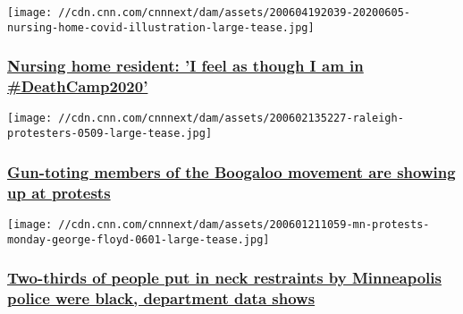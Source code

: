 \href{/2020/06/05/us/nursing-home-resident-coronavirus-invs/index.html}{}

\texttt{[image: //cdn.cnn.com/cnnnext/dam/assets/200604192039-20200605-nursing-home-covid-illustration-large-tease.jpg]}

\hypertarget{nursing-home-resident-i-feel-as-though-i-am-in-deathcamp2020}{%
\subsubsection{\texorpdfstring{\href{/2020/06/05/us/nursing-home-resident-coronavirus-invs/index.html}{Nursing
home resident: 'I feel as though I am in
\#DeathCamp2020'}}{Nursing home resident: 'I feel as though I am in \#DeathCamp2020'}}\label{nursing-home-resident-i-feel-as-though-i-am-in-deathcamp2020}}

\href{/2020/06/03/us/boogaloo-extremist-protests-invs/index.html}{}

\texttt{[image: //cdn.cnn.com/cnnnext/dam/assets/200602135227-raleigh-protesters-0509-large-tease.jpg]}

\hypertarget{gun-toting-members-of-the-boogaloo-movement-are-showing-up-at-protests-}{%
\subsubsection{\texorpdfstring{\href{/2020/06/03/us/boogaloo-extremist-protests-invs/index.html}{Gun-toting
members of the Boogaloo movement are showing up at protests
}}{Gun-toting members of the Boogaloo movement are showing up at protests }}\label{gun-toting-members-of-the-boogaloo-movement-are-showing-up-at-protests-}}

\href{/2020/06/02/us/mn-minneapolis-police-neck-restraints-george-floyd-invs/index.html}{}

\texttt{[image: //cdn.cnn.com/cnnnext/dam/assets/200601211059-mn-protests-monday-george-floyd-0601-large-tease.jpg]}

\hypertarget{two-thirds-of-people-put-in-neck-restraints-by-minneapolis-police-were-black-department-data-shows-}{%
\subsubsection{\texorpdfstring{\href{/2020/06/02/us/mn-minneapolis-police-neck-restraints-george-floyd-invs/index.html}{Two-thirds
of people put in neck restraints by Minneapolis police were black,
department data shows
}}{Two-thirds of people put in neck restraints by Minneapolis police were black, department data shows }}\label{two-thirds-of-people-put-in-neck-restraints-by-minneapolis-police-were-black-department-data-shows-}}

